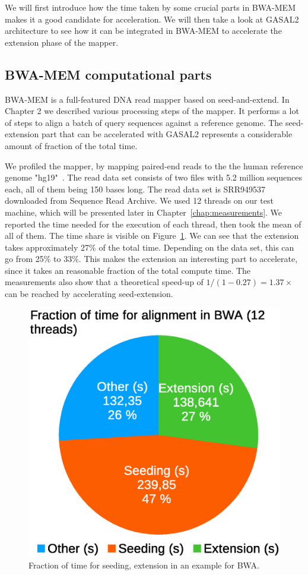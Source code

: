 

We will first introduce how the time taken by some crucial parts in BWA-MEM makes it a good candidate for acceleration. We will then take a look at GASAL2 architecture to see how it can be integrated in BWA-MEM to accelerate the extension phase of the mapper.


\subsection{BWA-MEM computational parts}

BWA-MEM is a full-featured DNA read mapper based on seed-and-extend. In Chapter 2 we described various processing steps of the mapper. It performs a lot of steps to align a batch of query sequences against a reference genome. The seed-extension part that can be accelerated with GASAL2 represents a considerable amount of fraction of the total time.

We profiled the mapper, by mapping paired-end reads to the the human reference genome "hg19"~\cite{ncbi:hg19}. The read data set consists of two files with 5.2 million sequences each, all of them being 150 bases long. The read data set is SRR949537~\cite{ncbi:srr150} downloaded from Sequence Read Archive. We used 12 threads on our test machine, which will be presented later in Chapter~\ref{chap:measurements}. We reported the time needed for the execution of each thread, then took the mean of all of them. The time share is visible on Figure~\ref{fig:bwatimedivision}. We can see that the extension takes approximately 27\% of the total time. Depending on the data set, this can go from 25\% to 33\%. This makes the extension an interesting part to accelerate, since it takes an reasonable fraction of the total compute time. The measurements also show that a theoretical speed-up of $1/\left(1 - 0.27\right) = 1.37\times$ can be reached by accelerating seed-extension.

\begin{figure}[h!]
	\centering
	\includegraphics[width=0.65\linewidth]{bwa_time_division}
	\caption{Fraction of time for seeding, extension in an example for BWA.}
	\label{fig:bwatimedivision}
\end{figure}


